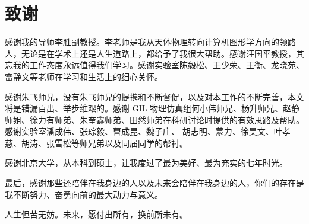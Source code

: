 \chapter{致谢}
感谢我的导师李胜副教授。李老师是我从天体物理转向计算机图形学方向的领路人，无论是在学术上还是人生道路上，都给予了我很大帮助。感谢汪国平教授，其忘我的工作态度永远值得我们学习。感谢实验室陈毅松、王少荣、王衡、龙晓苑、雷静文等老师在学习和生活上的细心关怀。

感谢朱飞师兄，没有朱飞师兄的提携和不断督促，以及对本工作的不断完善，本文将是错漏百出、举步维艰的。感谢 GIL 物理仿真组何小伟师兄、杨升师兄、赵静师姐、徐力有师弟、朱奎鑫师弟、田然师弟在科研讨论时提供的有效思路及帮助。感谢实验室潘成伟、张琮毅、曹成昆、魏子庄、 胡志明、蒙力、徐昊文、叶孝慈、胡涛、张雪松等师兄弟以及同届同学的帮衬。

感谢北京大学，从本科到硕士，让我度过了最为美好、最为充实的七年时光。

最后，感谢那些还陪伴在我身边的人以及未来会陪伴在我身边的人，你们的存在是我不断努力、奋勇向前的最大动力与意义。

人生但苦无妨。未来，愿付出所有，换前所未有。
